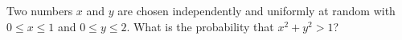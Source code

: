 Two numbers $x$ and $y$ are chosen independently and uniformly at random with $0\le x\le1$ and $0\le y\le2$. What is the probability that $x^2+y^2>1$?
